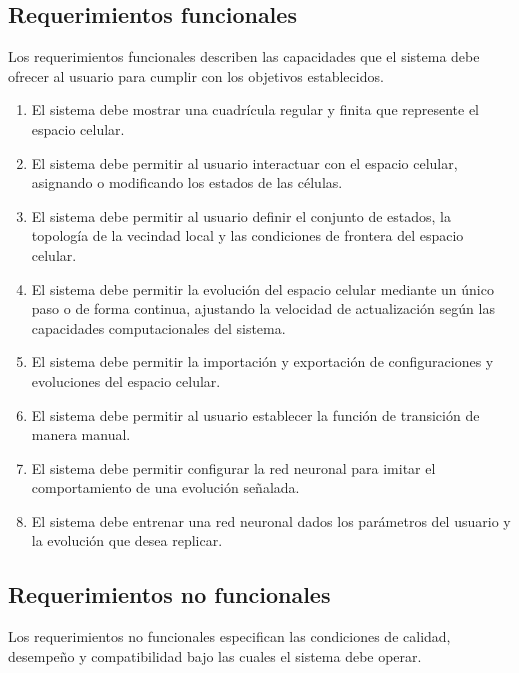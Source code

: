 \subsection{Requerimientos funcionales}

Los requerimientos funcionales describen las capacidades que el sistema debe ofrecer al usuario para cumplir con los objetivos establecidos.

\begin{enumerate}[label=RF\arabic*, noitemsep, leftmargin=*]
	
	\item El sistema debe mostrar una cuadrícula regular y finita que represente el espacio celular.
	
	\item El sistema debe permitir al usuario interactuar con el espacio celular, asignando o modificando los estados de las células.
	
	\item El sistema debe permitir al usuario definir el conjunto de estados, la topología de la vecindad local y las condiciones de frontera del espacio celular.
	
	\item El sistema debe permitir la evolución del espacio celular mediante un único paso o de forma continua, ajustando la velocidad de actualización según las capacidades computacionales del sistema.
	
	\item El sistema debe permitir la importación y exportación de configuraciones y evoluciones del espacio celular.
	
	\item El sistema debe permitir al usuario establecer la función de transición de manera manual.
	
	\item El sistema debe permitir configurar la red neuronal para imitar el comportamiento de una evolución señalada.
	
	\item El sistema debe entrenar una red neuronal dados los parámetros del usuario y la evolución que desea replicar.
	
\end{enumerate}

\subsection{Requerimientos no funcionales}

Los requerimientos no funcionales especifican las condiciones de calidad, desempeño y compatibilidad bajo las cuales el sistema debe operar.

